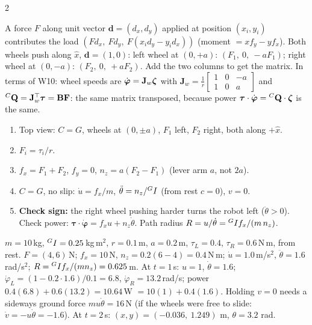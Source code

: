 \begin{multicols}{2}
\begin{fbx}
\end{fbx}
\begin{deriv}
A force $F$ along unit vector $\mathbf d=(d_x,d_y)$ applied at position $(x_i,y_i)$ contributes the load $(Fd_x,\ Fd_y,\ F(x_id_y-y_id_x))$ (moment $=x f_y-y f_x$). Both wheels push along $\hat x$, $\mathbf d=(1,0)$: left wheel at $(0,+a)$: $(F_1,\ 0,\ -aF_1)$; right wheel at $(0,-a)$: $(F_2,\ 0,\ +aF_2)$. Add the two columns to get the matrix. In terms of W10: wheel speeds are $\dot{\boldsymbol\varphi}=\mathbf J_w\boldsymbol\zeta$ with $\mathbf J_w=\frac1r\begin{bmatrix}1&0&-a\\1&0&a\end{bmatrix}$ and ${}^{C}\mathbf Q=\mathbf J_w^\top\boldsymbol\tau=\mathbf B\mathbf F$: the same matrix transposed, because power $\boldsymbol\tau\cdot\dot{\boldsymbol\varphi}={}^{C}\mathbf Q\cdot\boldsymbol\zeta$ is the same.
\end{deriv}
\begin{recipe}
\begin{enumerate}
\item Top view: $C=G$, wheels at $(0,\pm a)$, $F_1$ left, $F_2$ right, both along $+\hat x$.
\item $F_i=\tau_i/r$.
\item $f_x=F_1+F_2$, $f_y=0$, $n_z=a(F_2-F_1)$ (lever arm $a$, not $2a$).
\item $C=G$, no slip: $\dot u=f_x/m$, $\ddot\theta=n_z/{}^{G}I$ (from rest $c=0$), $v=0$.
\item \textbf{Check sign:} the right wheel pushing harder turns the robot left ($\ddot\theta>0$). Check power: $\boldsymbol\tau\cdot\dot{\boldsymbol\varphi}=f_xu+n_z\dot\theta$. Path radius $R=u/\dot\theta={}^{G}I f_x/(m\,n_z)$.
\end{enumerate}
\end{recipe}
\begin{worked}
$m=10$\,kg, ${}^{G}I=0.25$\,kg\,m$^2$, $r=0.1$\,m, $a=0.2$\,m, $\tau_L=0.4$, $\tau_R=0.6$\,N\,m, from rest. $F=(4,6)$\,N; $f_x=10$\,N, $n_z=0.2(6-4)=0.4$\,N\,m; $\dot u=\mathbf{1.0}$\,m/s$^2$, $\ddot\theta=\mathbf{1.6}$\,rad/s$^2$; $R={}^{G}I f_x/(mn_z)=0.625$\,m. At $t=1$\,s: $u=1$, $\dot\theta=1.6$; $\dot\varphi_L=(1-0.2\cdot1.6)/0.1=6.8$, $\dot\varphi_R=13.2$\,rad/s; power $0.4(6.8)+0.6(13.2)=10.64$\,W $=10(1)+0.4(1.6)$. Holding $v=0$ needs a sideways ground force $mu\dot\theta=16$\,N (if the wheels were free to slide: $\dot v=-u\dot\theta=-1.6$). At $t=2$\,s: $(x,y)=(-0.036,\ 1.249)$ m, $\theta=3.2$ rad. \chk

\end{worked}
\end{multicols}
